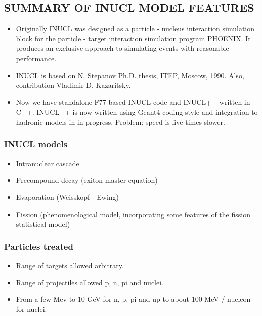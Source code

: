 \subsection{SUMMARY OF INUCL MODEL FEATURES}
\begin{itemize}
\item Originally INUCL was designed as a particle - nucleus interaction simulation block for the particle - target interaction simulation program PHOENIX. It produces an exclusive approach to simulating events with reasonable performance.
\item INUCL is based on N. Stepanov Ph.D. thesis, ITEP, Moscow, 1990.
Also, contribution Vladimir D. Kazaritsky.
\item Now we have standalone F77 based INUCL code and INUCL++ written in C++.
INUCL++ is now written using Geant4 coding style and integration to hadronic models in in progress. Problem: speed is five times slower.
\end{itemize}

\subsubsection{INUCL models}
\begin{itemize}
\item Intranuclear cascade
\item Precompound decay (exiton master equation) 
\item Evaporation (Weisskopf - Ewing) 
\item Fission (phenomenological model, incorporating some features of the fission statistical model)
\end{itemize}

\subsubsection{Particles treated}
\begin{itemize}
\item Range of targets allowed arbitrary.
\item Range of projectiles allowed p, n, pi and nuclei.
\item From a few Mev to 10 GeV for n, p, pi and up to about 100 MeV / nucleon for nuclei.
\end{itemize}

